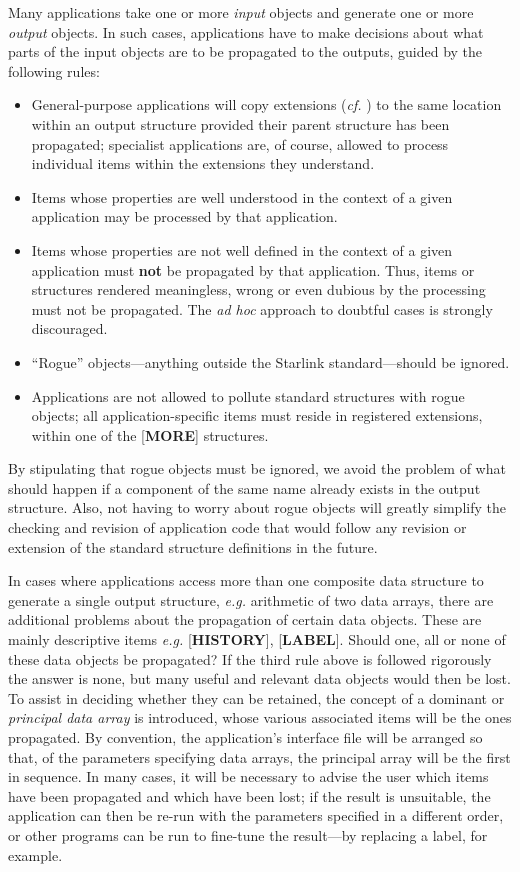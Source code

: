 Many applications take one or more {\it input} objects and
generate one or more {\it output} objects.  In such cases,
applications have to make
decisions about what parts of the input
objects are to be propagated to the outputs, guided by the
following rules:
\begin{itemize}
\item
General-purpose applications will copy extensions ({\it cf.} 
)
to the same location within an output structure provided their
parent structure has
been propagated; specialist applications are, of course,
allowed to process individual items within the extensions
they understand.
\item
Items whose properties are well understood in the context of a given
application may be processed by that application.
\item
Items whose properties are not well defined in the context of a given
application must {\bf not} be propagated by that application.  Thus, items
or structures rendered meaningless, wrong or even dubious by the
processing must not be propagated.  The {\it ad hoc} approach to
doubtful cases is strongly discouraged.
\item
``Rogue'' objects---anything outside the Starlink standard---should 
be ignored.
\item
Applications are not allowed to pollute standard structures
with rogue objects;  all application-specific items must reside
in registered extensions, within one of the {[}{\bf MORE}{]}
structures.
\end{itemize}

By stipulating that rogue objects must be ignored, we
avoid the problem of what should happen
if a component of the same name already exists in the output structure.
Also, not having to worry about rogue objects will greatly simplify the
checking and revision of application code that would follow
any revision or extension of the standard structure definitions
in the future.

In cases where applications access more than one composite data structure
to generate a single output structure, {\it e.g.} arithmetic of two data
arrays, there are additional problems about the propagation of certain
data objects.  These are mainly descriptive items {\it e.g.}
{[}{\bf HISTORY}{]}, {[}{\bf LABEL}{]}.
Should one, all or none of these data objects be propagated?
If the third rule above is followed rigorously the answer is none, but
many useful and relevant data objects would then be lost.  To assist
in deciding whether they can be
retained, the concept of a dominant or {\it principal data array} is 
introduced, whose various associated items will be the ones propagated.
By convention, the application's interface file
will be arranged so that, of the parameters specifying data
arrays, the principal array will be the first in sequence.  In many
cases, it will be necessary to advise the user which items have
been propagated and which have been lost;  if the result is
unsuitable, the application can then be re-run with the
parameters specified in a different order, or other programs can
be run to fine-tune the result---by replacing a label, for example.

